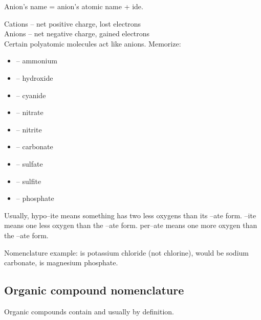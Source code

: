 \documentclass[letterpaper, 12pt]{article}
\begin{document}
	Anion's name = anion's atomic name + ide.

	Cations -- net positive charge, lost electrons\\
	Anions -- net negative charge, gained electrons\\

	Certain polyatomic molecules act like anions. Memorize:
	\begin{itemize}
		\item {} -- ammonium
		\item {} -- hydroxide
		\item {} -- cyanide
		\item {} -- nitrate
		\item {} -- nitrite
		\item {} -- carbonate
		\item {} -- sulfate
		\item {} -- sulfite
		\item {} -- phosphate
	\end{itemize}

	Usually, hypo--ite means something has two less oxygens than its --ate form. --ite means one less oxygen than the --ate form. per--ate means one more oxygen than the --ate form.

	Nomenclature example:  is potassium chloride (not chlorine),  would be sodium carbonate,  is magnesium phosphate.

	\subsection{Organic compound nomenclature}
	Organic compounds contain  and usually  by definition.
\end{document}
